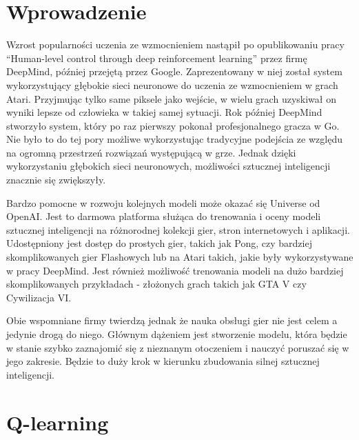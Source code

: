 \documentclass[preprint,12pt]{elsarticle}
\begin{document}

\section{Wprowadzenie}
\label{S:1}

Wzrost popularności uczenia ze wzmocnieniem nastąpił po opublikowaniu pracy ``Human-level control through deep reinforcement learning'' \cite{DeepMind:2015} przez firmę DeepMind, później przejętą przez Google. Zaprezentowany w niej został system wykorzystujący głębokie sieci neuronowe do uczenia ze wzmocnieniem w grach Atari. Przyjmując tylko same piksele jako wejście, w wielu grach uzyskiwał on wyniki lepsze od człowieka w takiej samej sytuacji. Rok później DeepMind stworzyło system, który po raz pierwszy pokonał profesjonalnego gracza w Go. Nie było to do tej pory możliwe wykorzystując tradycyjne podejścia ze względu na ogromną przestrzeń rozwiązań występującą w grze. Jednak dzięki wykorzystaniu głębokich sieci neuronowych, możliwości sztucznej inteligencji znacznie się zwiększyły. 

Bardzo pomocne w rozwoju kolejnych modeli może okazać się Universe od OpenAI. Jest to darmowa platforma służąca do trenowania i oceny modeli sztucznej inteligencji na różnorodnej kolekcji gier, stron internetowych i aplikacji. Udostępniony jest dostęp do prostych gier, takich jak Pong, czy bardziej skomplikowanych gier Flashowych lub na Atari takich, jakie były wykorzystywane w pracy DeepMind. Jest również możliwość trenowania modeli na dużo bardziej skomplikowanych przykładach - złożonych grach takich jak GTA V czy Cywilizacja VI.

Obie wspomniane firmy twierdzą jednak że nauka obsługi gier nie jest celem a jedynie drogą do niego. Głównym dążeniem jest stworzenie modelu,  która będzie w stanie szybko zaznajomić się z nieznanym otoczeniem i nauczyć poruszać się w jego zakresie. Będzie to duży krok w kierunku zbudowania silnej sztucznej inteligencji.

\section{Q-learning}
\end{document}
